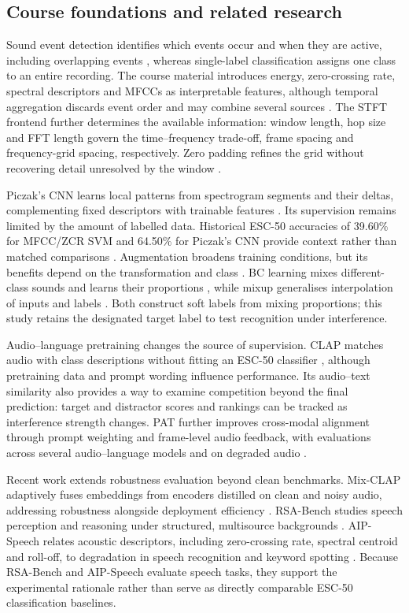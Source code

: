 \documentclass[a4paper,10pt]{article}
\begin{document}
\subsection{Course foundations and related research}

Sound event detection identifies which events occur and when they are active, including overlapping events \cite{sed}, whereas single-label classification assigns one class to an entire recording. The course material introduces energy, zero-crossing rate, spectral descriptors and MFCCs as interpretable features, although temporal aggregation discards event order and may combine several sources \cite{course3}. The STFT frontend further determines the available information: window length, hop size and FFT length govern the time--frequency trade-off, frame spacing and frequency-grid spacing, respectively. Zero padding refines the grid without recovering detail unresolved by the window \cite{course4}.

Piczak's CNN learns local patterns from spectrogram segments and their deltas, complementing fixed descriptors with trainable features \cite{piczak}. Its supervision remains limited by the amount of labelled data. Historical ESC-50 accuracies of 39.60\% for MFCC/ZCR SVM and 64.50\% for Piczak's CNN provide context rather than matched comparisons \cite{piczak,esc}. Augmentation broadens training conditions, but its benefits depend on the transformation and class \cite{augmentation}. BC learning mixes different-class sounds and learns their proportions \cite{bc}, while mixup generalises interpolation of inputs and labels \cite{mixup}. Both construct soft labels from mixing proportions; this study retains the designated target label to test recognition under interference.

Audio--language pretraining changes the source of supervision. CLAP matches audio with class descriptions without fitting an ESC-50 classifier \cite{clap}, although pretraining data and prompt wording influence performance. Its audio--text similarity also provides a way to examine competition beyond the final prediction: target and distractor scores and rankings can be tracked as interference strength changes. PAT further improves cross-modal alignment through prompt weighting and frame-level audio feedback, with evaluations across several audio--language models and on degraded audio \cite{pat}.

Recent work extends robustness evaluation beyond clean benchmarks. Mix-CLAP adaptively fuses embeddings from encoders distilled on clean and noisy audio, addressing robustness alongside deployment efficiency \cite{mixclap}. RSA-Bench studies speech perception and reasoning under structured, multisource backgrounds \cite{rsa}. AIP-Speech relates acoustic descriptors, including zero-crossing rate, spectral centroid and roll-off, to degradation in speech recognition and keyword spotting \cite{aip}. Because RSA-Bench and AIP-Speech evaluate speech tasks, they support the experimental rationale rather than serve as directly comparable ESC-50 classification baselines.
\end{document}
